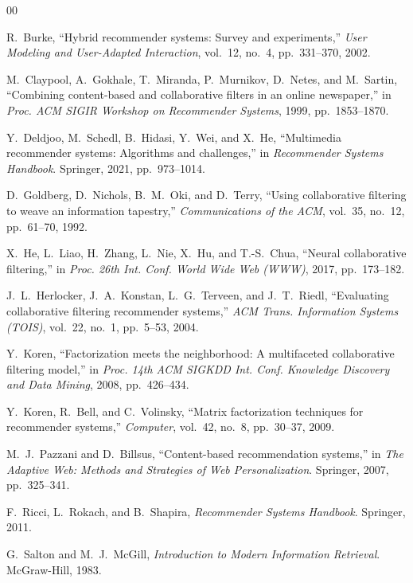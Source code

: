 \documentclass[conference]{IEEEtran}
\begin{document}
\begin{thebibliography}{00}

R.~Burke, ``Hybrid recommender systems: Survey and experiments,''
\emph{User Modeling and User-Adapted Interaction}, vol.~12, no.~4,
pp.~331--370, 2002.

M.~Claypool, A.~Gokhale, T.~Miranda, P.~Murnikov, D.~Netes, and M.~Sartin,
``Combining content-based and collaborative filters in an online newspaper,''
in \emph{Proc. ACM SIGIR Workshop on Recommender Systems}, 1999,
pp.~1853--1870.

Y.~Deldjoo, M.~Schedl, B.~Hidasi, Y.~Wei, and X.~He,
``Multimedia recommender systems: Algorithms and challenges,''
in \emph{Recommender Systems Handbook}. Springer, 2021, pp.~973--1014.

D.~Goldberg, D.~Nichols, B.~M.~Oki, and D.~Terry,
``Using collaborative filtering to weave an information tapestry,''
\emph{Communications of the ACM}, vol.~35, no.~12, pp.~61--70, 1992.

X.~He, L.~Liao, H.~Zhang, L.~Nie, X.~Hu, and T.-S.~Chua,
``Neural collaborative filtering,''
in \emph{Proc. 26th Int. Conf. World Wide Web (WWW)}, 2017, pp.~173--182.

J.~L.~Herlocker, J.~A.~Konstan, L.~G.~Terveen, and J.~T.~Riedl,
``Evaluating collaborative filtering recommender systems,''
\emph{ACM Trans. Information Systems (TOIS)}, vol.~22, no.~1, pp.~5--53, 2004.

Y.~Koren,
``Factorization meets the neighborhood: A multifaceted collaborative
filtering model,''
in \emph{Proc. 14th ACM SIGKDD Int. Conf. Knowledge Discovery and Data Mining},
2008, pp.~426--434.

Y.~Koren, R.~Bell, and C.~Volinsky,
``Matrix factorization techniques for recommender systems,''
\emph{Computer}, vol.~42, no.~8, pp.~30--37, 2009.

M.~J.~Pazzani and D.~Billsus,
``Content-based recommendation systems,''
in \emph{The Adaptive Web: Methods and Strategies of Web Personalization}.
Springer, 2007, pp.~325--341.

F.~Ricci, L.~Rokach, and B.~Shapira,
\emph{Recommender Systems Handbook}.
Springer, 2011.

G.~Salton and M.~J.~McGill,
\emph{Introduction to Modern Information Retrieval}.
McGraw-Hill, 1983.


\end{thebibliography}
\end{document}
